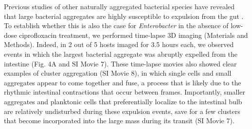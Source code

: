 Previous studies of other naturally aggregated bacterial species have revealed that large bacterial aggregates are highly susceptible to expulsion from the gut \cite{Wiles2016,Logan2018}. To establish whether this is also the case for \textit{Enterobacter} in the absence of low-dose ciprofloxacin treatment, we performed time-lapse 3D imaging (Materials and Methods). Indeed, in 2 out of 5 hosts imaged for 3.5 hours each, we observed events in which the largest bacterial aggregate was abruptly expelled from the intestine (Fig. 4A and SI Movie 7). These time-lapse movies also showed clear examples of cluster aggregation (SI Movie 8), in which single cells and small aggregates appear to come together and fuse, a process that is likely due to the rhythmic intestinal contractions that occur between frames. Importantly, smaller aggregates and planktonic cells that preferentially localize to the intestinal bulb are relatively undisturbed during these expulsion events, save for a few clusters that become incorporated into the large mass during its transit (SI Movie 7). 

